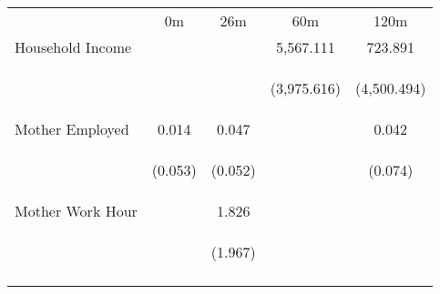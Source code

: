\begin{tabular}{lcccc}
\hline \noalign{\smallskip} & 0m & 26m & 60m & 120m\\
\noalign{\smallskip}\hline \noalign{\smallskip}Household Income &  &  & 5,567.111 & 723.891\\
 & \begin{footnotesize}\end{footnotesize} & \begin{footnotesize}\end{footnotesize} & \begin{footnotesize}(3,975.616)\end{footnotesize} & \begin{footnotesize}(4,500.494)\end{footnotesize}\\
\noalign{\smallskip}Mother Employed & 0.014 & 0.047 &  & 0.042\\
 & \begin{footnotesize}(0.053)\end{footnotesize} & \begin{footnotesize}(0.052)\end{footnotesize} & \begin{footnotesize}\end{footnotesize} & \begin{footnotesize}(0.074)\end{footnotesize}\\
\noalign{\smallskip}Mother Work Hour &  & 1.826 &  & \\
 & \begin{footnotesize}\end{footnotesize} & \begin{footnotesize}(1.967)\end{footnotesize} & \begin{footnotesize}\end{footnotesize} & \begin{footnotesize}\end{footnotesize}\\
\noalign{\smallskip}\hline\end{tabular}\\
